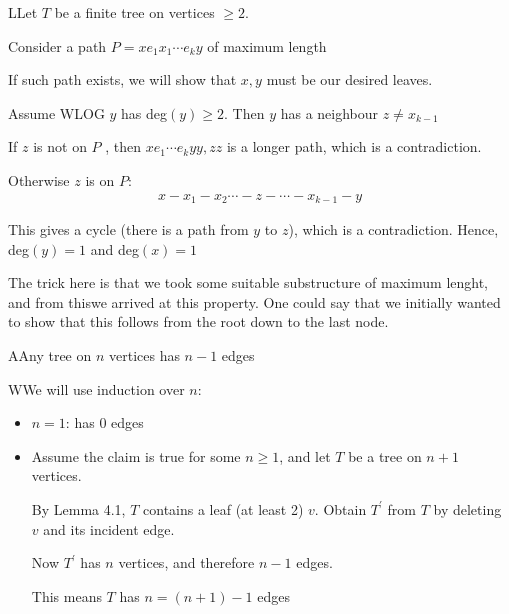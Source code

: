 \begin{prf}
  LLet $T$ be a finite tree on vertices $\geq2$.\par
  \noindent Consider a path $P = xe_1x_1\cdots e_ky$ of maximum length
  \par\bigskip
  \noindent If such path exists, we will show that $x,y$ must be our desired leaves.
  \par\bigskip
  \noindent Assume WLOG $y$ has deg$(y)\geq2$. Then $y$ has a neighbour $z\neq x_{k-1}$\par
  \noindent If $z$ is not on $P$ , then $xe_1\cdots e_ky{y,z}z$ is a longer path, which is a contradiction.
  \par\bigskip
  \noindent Otherwise $z$ is on $P$:
  \begin{equation*}
    \begin{gathered}
      x-x_1-x_2\cdots-z-\cdots-x_{k-1}-y
    \end{gathered}
  \end{equation*}\par
  \noindent This gives a cycle (there is a path from $y$ to $z$), which is a contradiction. Hence, deg$(y)=1$ and deg$(x)=1$
\end{prf}
\par\bigskip
\noindent The trick here is that we took some suitable substructure of maximum lenght, and from thiswe arrived at this property. One could say that we initially wanted to show that this follows from the root down to the last node.
\par\bigskip
\begin{lem}
  AAny tree on $n$ vertices has $n-1$ edges
\end{lem}
\par\bigskip
\begin{prf}
  WWe will use induction over $n$:\par
  \begin{itemize}
    \item $n=1$: has 0 edges
    \item Assume the claim is true for some $n\geq1$, and let $T$ be a tree on $n+1$ vertices.\par
      By Lemma 4.1, $T$ contains a leaf (at least 2) $v$. Obtain $T^{\prime}$ from $T$ by deleting $v$ and its incident edge.\par
      Now $T^{\prime}$ has $n$ vertices, and therefore $n-1$ edges.\par
      This means $T$ has $n= (n+1)-1$ edges
  \end{itemize}
\end{prf}
